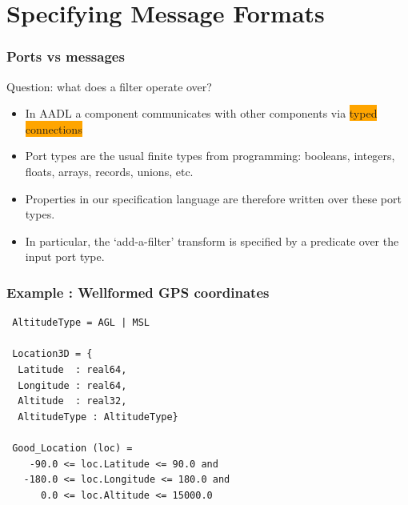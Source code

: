 \documentclass{beamer}
\newcommand{\kemph}[1]{\colorbox{orange}{#1}}
\begin{document}
\section {Specifying Message Formats}

\begin{frame}\frametitle{Ports vs messages}

Question: what does a filter operate over?

\begin{itemize}

\item In AADL a component communicates with other components via
  \kemph{typed connections}

\item Port types are the usual finite types from programming:
  booleans, integers, floats, arrays, records, unions, etc.

\item Properties in our specification language are therefore
  written over these port types.

\item In particular, the `add-a-filter' transform is specified by a predicate over the input port type.

\end{itemize}

\end{frame}

\begin{frame}[fragile]\frametitle{Example : Wellformed GPS coordinates}

{\small
\begin{verbatim}
 AltitudeType = AGL | MSL

 Location3D = {
  Latitude  : real64,
  Longitude : real64,
  Altitude  : real32,
  AltitudeType : AltitudeType}

 Good_Location (loc) =
    -90.0 <= loc.Latitude <= 90.0 and
   -180.0 <= loc.Longitude <= 180.0 and
      0.0 <= loc.Altitude <= 15000.0
\end{verbatim}
}

\end{frame}
\end{document}
